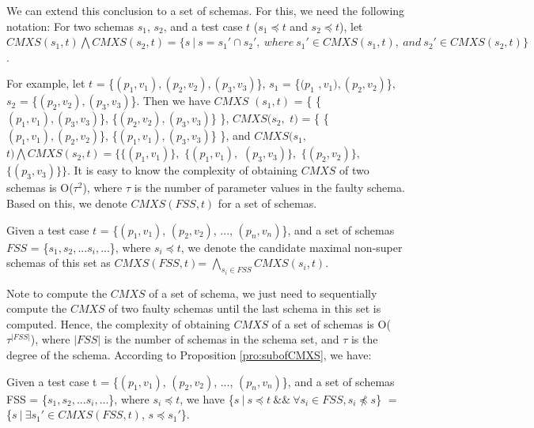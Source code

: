 We can extend this conclusion to a set of schemas. For this, we need the following notation: For two schemas $s_{1}$, $s_{2}$, and a test case $t$ ($s_{1} \preceq t$ and $s_{2} \preceq t$), let $CMXS(s_{1}, t) \bigwedge CMXS(s_{2}, t)  = \{ s\ |\ s = s_{1}' \cap s_{2}',\ where\ s_{1}' \in CMXS(s_{1}, t),\ and\ s_{2}' \in CMXS(s_{2}, t) \}$.

For example, let $t$ = \{$(p_{1},v_{1}), (p_{2}, v_{2}), (p_{3}, v_{3})$\}, $s_{1}$ = \{$(p_{1}$ $, v_{1}), (p_{2}, v_{2})$\}, $s_{2}$ = \{$(p_{2}, v_{2}), (p_{3}, v_{3})$\}. Then we have $CMXS$ $(s_{1}, t)$ = \{ \{$(p_{1}, v_{1}), (p_{3}, v_{3})$\}, \{$(p_{2}, v_{2}), (p_{3}, v_{3})$\} \}, $CMXS(s_{2},$ $ t)$ = \{ \{$(p_{1}, v_{1}), (p_{2}, v_{2})$\}, \{$(p_{1}, v_{1}), (p_{3}, v_{3})$\} \}, and  $CMXS(s_{1},$ $ t) \bigwedge CMXS(s_{2}, t) = \{ \{(p_{1}, v_{1})\},$ $ \{(p_{1}, v_{1}), $ $(p_{3}, v_{3})\}, $ $ \{(p_{2}, v_{2})\}, $ $\{(p_{3}, v_{3})\} \} $. It is easy to know the complexity of obtaining $CMXS$ of two schemas is O($\tau^{2}$), where $\tau$ is the number of parameter values in the faulty schema. Based on this, we denote $CMXS(FSS,t)$ for a set of schemas.

\begin{definition}
Given a test case $t$ = \{$(p_{1}, v_{1})$, $(p_{2}, v_{2})$, ..., $(p_{n}, v_{n})$\}, and a set of schemas $FSS$ = \{$s_{1} , s_{2}, ... s_{i}, ...$\}, where $ s_{i} \preceq t$,  we denote the candidate maximal non-super schemas of this set as $CMXS(FSS,t)$= $\bigwedge_{s_{i}\in FSS} CMXS(s_{i}, t)$.
\end{definition}

Note to compute the $CMXS$ of a set of schema, we just need to sequentially compute the $CMXS$ of two faulty schemas until the last schema in this set is computed. Hence, the complexity of obtaining $CMXS$ of a set of schemas is O($\tau^{|FSS|}$), where $|FSS|$ is the number of schemas in the schema set, and $\tau$ is the degree of the schema. According to Proposition \ref{pro:subofCMXS}, we have:

\begin{proposition}\label{pro:subofCMXSfor2}
Given a test case t = \{$(p_{1}, v_{1})$, $(p_{2}, v_{2})$, ..., $(p_{n}, v_{n})$\}, and a set of schemas FSS = \{$s_{1} , s_{2}, ... s_{i}, ...$\}, where $ s_{i} \preceq t$,  we have \{$s\ |\ s \preceq t\ \&\&\ \forall s_{i} \in FSS, s_{i} \npreceq s $\} $=$  \{$ s\ |\ \exists s_{1}' \in CMXS(FSS, t)$, $s \preceq s_{1}'$\}.
\end{proposition}

